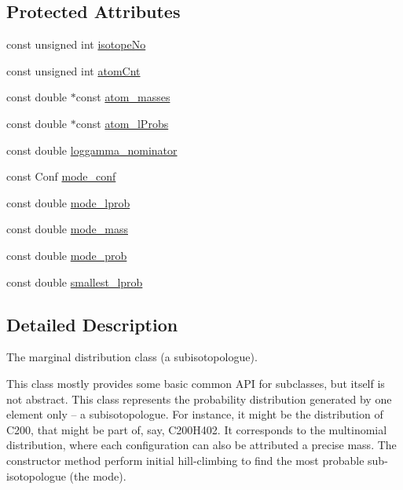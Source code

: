 \subsection*{Protected Attributes}
\begin{DoxyCompactItemize}
\item 
const unsigned int \mbox{\hyperlink{class_iso_spec_1_1_marginal_a8dd6415882661f7b9ceedbe09bc200e3}{isotope\+No}}
\item 
const unsigned int \mbox{\hyperlink{class_iso_spec_1_1_marginal_a53c2af7dcb84aa9d5e0e0918fe7875cd}{atom\+Cnt}}
\item 
const double $\ast$const \mbox{\hyperlink{class_iso_spec_1_1_marginal_a91265e07f5bb65314995f816f5a9c729}{atom\+\_\+masses}}
\item 
const double $\ast$const \mbox{\hyperlink{class_iso_spec_1_1_marginal_af059df011e707781fdd4c1d7b70bd91a}{atom\+\_\+l\+Probs}}
\item 
const double \mbox{\hyperlink{class_iso_spec_1_1_marginal_aa3fb5ed3a9b63a855d6270287aed7417}{loggamma\+\_\+nominator}}
\item 
const Conf \mbox{\hyperlink{class_iso_spec_1_1_marginal_a640f3b44605b510ee556a25e35a2e095}{mode\+\_\+conf}}
\item 
const double \mbox{\hyperlink{class_iso_spec_1_1_marginal_a38238e7581f59f08d0faf8ab5eabc0dc}{mode\+\_\+lprob}}
\item 
const double \mbox{\hyperlink{class_iso_spec_1_1_marginal_a3bfea931e5e1ec1e7d90e8e096c38eb7}{mode\+\_\+mass}}
\item 
const double \mbox{\hyperlink{class_iso_spec_1_1_marginal_a75315ec4c470be5f82b903172f7c43ae}{mode\+\_\+prob}}
\item 
const double \mbox{\hyperlink{class_iso_spec_1_1_marginal_a2abd05ba9351e21cd99e2783e26bd6dc}{smallest\+\_\+lprob}}
\end{DoxyCompactItemize}


\subsection{Detailed Description}
The marginal distribution class (a subisotopologue). 

This class mostly provides some basic common A\+PI for subclasses, but itself is not abstract. This class represents the probability distribution generated by one element only -- a subisotopologue. For instance, it might be the distribution of C200, that might be part of, say, C200\+H402. It corresponds to the multinomial distribution, where each configuration can also be attributed a precise mass. The constructor method perform initial hill-\/climbing to find the most probable sub-\/isotopologue (the mode). 

